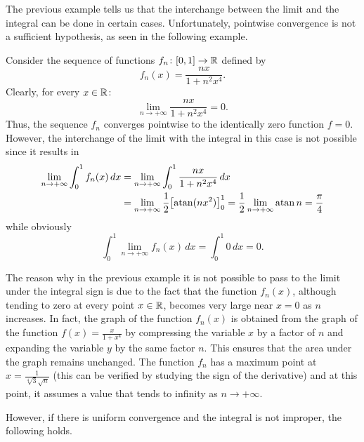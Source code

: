 The previous example tells us that the interchange between the limit and the
integral can be done in certain cases. Unfortunately, pointwise convergence is
not a sufficient hypothesis, as seen in the following example.

\begin{example}
Consider the sequence of functions $f_n\colon[0,1]\to{\mathbb R}$ defined by 
\[
 f_n(x) = \frac{nx}{1+n^2x^4}.  
\]
Clearly, for every $x\in {\mathbb R}$:
\[
  \lim_{n\to+\infty} \frac{nx}{1+n^2x^4} = 0.
\]
Thus, the sequence $f_n$ converges pointwise to the identically zero function
$f=0$. However, the interchange of the limit with the integral in this case is
not possible since it results in
\begin{align*}
\lim_{n\to +\infty} \int_0^1 f_n(x)\, dx 
&= \lim_{n\to +\infty} \int_0^1 \frac{nx}{1+n^2x^4}\, dx \\
&=\lim_{n\to +\infty} \frac 1 2 {\left[ \operatorname{atan}(nx^2) \right]}_0^1 
 = \frac 1 2 \lim_{n\to +\infty} \operatorname{atan} n = \frac \pi 4 
\end{align*}
while obviously 
\[
 \int_0^1 \lim_{n\to +\infty} f_n(x)\, dx = \int_0^1 0\, dx = 0.
\]
\end{example}

The reason why in the previous example it is not possible to pass to the limit
under the integral sign is due to the fact that the function $f_n(x)$, although
tending to zero at every point $x\in {\mathbb R}$, becomes very large near $x=0$ as $n$
increases. In fact, the graph of the function $f_n(x)$ is obtained from the
graph of the function $f(x) = \frac{x}{1+x^4}$ by compressing the variable $x$
by a factor of $n$ and expanding the variable $y$ by the same factor $n$. This
ensures that the area under the graph remains unchanged. The function $f_n$ has
a maximum point at $x=\frac{1}{\sqrt[4]3 \sqrt n}$ (this can be verified by
studying the sign of the derivative) and at this point, it assumes a value that
tends to infinity as $n\to +\infty$.

However, if there is uniform convergence and the integral is not improper, the
following holds.

